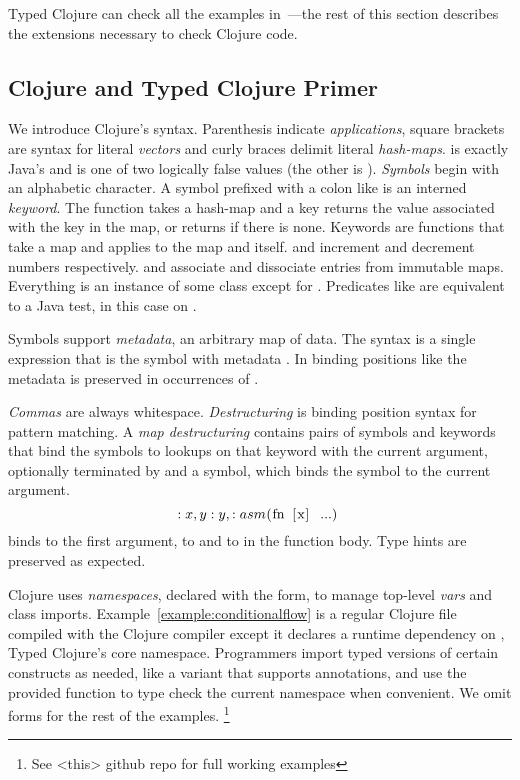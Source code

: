 \begin{exmp}
\inputminted[firstline=1]{clojure}{code/demo/src/demo/eg1.clj}
\label{example:conditionalflow}
\end{exmp}

Typed Clojure can check all the examples in~\citet{TF10}---the 
rest of this section describes the extensions necessary
to check Clojure code.

\subsection{Clojure and Typed Clojure Primer}

We introduce Clojure's syntax.
Parenthesis indicate \emph{applications}, square brackets
are syntax for literal \emph{vectors} and curly braces delimit literal
\emph{hash-maps}.
 is exactly Java's  and is one of two logically
false values (the other is ).
\emph{Symbols} begin with an alphabetic character.
A symbol prefixed with a colon like  is an interned \emph{keyword}.
The  function takes a hash-map and a key returns the value
associated with the key in the map, or returns  if there is none.
Keywords are functions that take a map and applies  to the map
and itself.
 and  increment and decrement numbers respectively.
 and  associate and dissociate entries
from immutable maps.
Everything is an instance of some class
except for . Predicates like  are equivalent to
a Java  test, in this case on .

Symbols support \emph{metadata}, an arbitrary map of
data. The syntax  is a single expression that is the symbol  
with metadata .
In binding positions like 
the metadata is preserved in occurrences of .

\emph{Commas} are always whitespace.
\emph{Destructuring} is binding position syntax for pattern matching.
A \emph{map destructuring} contains pairs of symbols and keywords that bind the symbols
to lookups on that keyword with the current argument, optionally terminated by
 and a symbol, which binds the symbol to the current argument.
$$
\clj{(fn [{x :x, y :y, :as m}] ...)}
$$ 
binds  to the first argument,
 to  and
 to  in the function body. Type hints are preserved as expected.

Clojure uses \emph{namespaces}, declared with the
 form, to manage top-level \emph{vars} and
class imports.
Example~\ref{example:conditionalflow}
is a regular Clojure file compiled with
the Clojure compiler except it declares a runtime dependency on
, Typed Clojure's core namespace.
Programmers import typed versions of certain constructs as needed, like
a  variant that supports annotations,
and use the provided  function to type check the current namespace
when convenient.
We omit  forms for the rest of the examples.
\footnote{See <this> github repo for full working examples}


